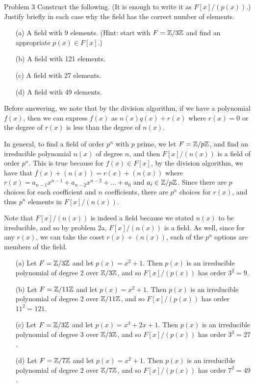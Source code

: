 \documentclass{hmwk}
\begin{document}
\begin{problem}{Problem 3}
    Construct the following. (It is enough to write it as $F[x]/(p(x))$.) Justify briefly in each case why the field has the correct number of elements.
    \begin{itemize}
        \item[(a)] A field with 9 elements.  (Hint: start with $F = \mathbb{Z}/3\mathbb{Z}$ and find an appropriate $p(x) \in F[x]$.)
        \item[(b)] A field with 121 elements.
        \item[(c)] A field with 27 elements.
        \item[(d)] A field with 49 elements.
    \end{itemize}
\end{problem}

\begin{solution}

\pre Before answering, we note that by the division algorithm, if we have a polynomial $f(x)$, then we can express $f(x)$ as $n(x)q(x) + r(x)$ where $r(x) = 0$ or the degree of $r(x)$ is less than the degree of $n(x)$. 

\pre In general, to find a field of order $p^n$ with $p$ prime, we let $F = \mathbb{Z}/p\mathbb{Z}$, and find an irreducible polynomial $n(x)$ of degree $n$, and then $F[x]/(n(x))$ is a field of order $p^n$. This is true because for $f(x) \in F[x]$, by the division algorithm, we have that $f(x) + (n(x)) = r(x) + (n(x))$ where $r(x) = a_{n-1}x^{n-1} + a_{n-2}x^{n-2} + \dots + a_0$ and $a_i \in \mathbb{Z}/p\mathbb{Z}$. Since there are $p$ choices for each coefficient and $n$ coefficients, there are $p^n$ choices for $r(x)$, and thus $p^n$ elements in $F[x]/(n(x))$. 

\pre Note that $F[x]/(n(x))$ is indeed a field because we stated $n(x)$ to be irreducible, and so by problem 2a, $F[x]/(n(x))$ is a field. As well, since for any $r(x)$, we can take the coset $r(x) + (n(x))$, each of the $p^n$ options are members of the field. 

\begin{itemize}
    \item[(a)] Let $F = \mathbb{Z}/3\mathbb{Z}$ and let $p(x) = x^2 + 1$. Then $p(x)$ is an irreducible polynomial of degree 2 over $\mathbb{Z}/3\mathbb{Z}$, and so $F[x]/(p(x))$ has order $3^2 = 9$. 
    \item[(b)] Let $F = \mathbb{Z}/11\mathbb{Z}$ and let $p(x) = x^2 + 1$. Then $p(x)$ is an irreducible polynomial of degree 2 over $\mathbb{Z}/11\mathbb{Z}$, and so $F[x]/(p(x))$ has order $11^2 = 121$. 
    \item[(c)] Let $F = \mathbb{Z}/3\mathbb{Z}$ and let $p(x) = x^3 + 2x + 1$. Then $p(x)$ is an irreducible polynomial of degree 3 over $\mathbb{Z}/3\mathbb{Z}$, and so $F[x]/(p(x))$ has order $3^3 = 27$.
    \item[(d)] Let $F = \mathbb{Z}/7\mathbb{Z}$ and let $p(x) = x^2 + 1$. Then $p(x)$ is an irreducible polynomial of degree 2 over $\mathbb{Z}/7\mathbb{Z}$, and so $F[x]/(p(x))$ has order $7^2 = 49$.
\end{itemize}
\end{solution}
\end{document}
